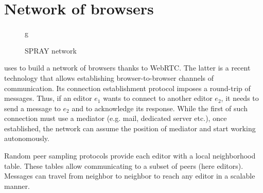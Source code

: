 
\section{Network of browsers}
\label{sec:network}

\begin{figure}
  \centering
g  
  \caption{SPRAY network}
  \label{fig:spray}
\end{figure}


\CRATE uses \SPRAY to build a network of browsers thanks to WebRTC. The latter
is a recent technology that allows establishing browser-to-browser channels of
communication. Its connection establishment protocol imposes a round-trip of
messages. Thus, if an editor $e_1$ wants to connect to another editor $e_2$, it
needs to send a message to $e_2$ and to acknowledge its response. While the
first of such connection must use a mediator (e.g. mail, dedicated server etc.),
once established, the network can assume the position of mediator and start
working autonomously.

Random peer sampling protocols provide each editor with a local neighborhood
table. These tables allow communicating to a subset of peers (here
editors). Messages can travel from neighbor to neighbor to reach any editor in a
scalable manner.



